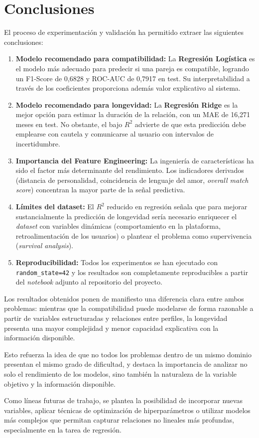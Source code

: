 \section{Conclusiones}
\label{sec:conclusiones_modelado}

El proceso de experimentación y validación ha permitido extraer las siguientes conclusiones:

\begin{enumerate}
    \item \textbf{Modelo recomendado para compatibilidad:} La \textbf{Regresión Logística} es el modelo más adecuado para predecir si una pareja es compatible, logrando un F1-Score de 0,6828 y ROC-AUC de 0,7917 en test. Su interpretabilidad a través de los coeficientes proporciona además valor explicativo al sistema.

    \item \textbf{Modelo recomendado para longevidad:} La \textbf{Regresión Ridge} es la mejor opción para estimar la duración de la relación, con un MAE de 16,271 meses en test. No obstante, el bajo $R^2$ advierte de que esta predicción debe emplearse con cautela y comunicarse al usuario con intervalos de incertidumbre.

    \item \textbf{Importancia del Feature Engineering:} La ingeniería de características ha sido el factor más determinante del rendimiento. Los indicadores derivados (distancia de personalidad, coincidencia de lenguaje del amor, \textit{overall match score}) concentran la mayor parte de la señal predictiva.

    \item \textbf{Límites del dataset:} El $R^2$ reducido en regresión señala que para mejorar sustancialmente la predicción de longevidad sería necesario enriquecer el \textit{dataset} con variables dinámicas (comportamiento en la plataforma, retroalimentación de los usuarios) o plantear el problema como supervivencia (\textit{survival analysis}).

    \item \textbf{Reproducibilidad:} Todos los experimentos se han ejecutado con \texttt{random\_state=42} y los resultados son completamente reproducibles a partir del \textit{notebook} adjunto al repositorio del proyecto.
\end{enumerate}

Los resultados obtenidos ponen de manifiesto una diferencia clara entre ambos problemas: mientras que la compatibilidad puede modelarse de forma razonable a partir de variables estructuradas y relaciones entre perfiles, la longevidad presenta una mayor complejidad y menor capacidad explicativa con la información disponible.

Esto refuerza la idea de que no todos los problemas dentro de un mismo dominio presentan el mismo grado de dificultad, y destaca la importancia de analizar no solo el rendimiento de los modelos, sino también la naturaleza de la variable objetivo y la información disponible.

Como líneas futuras de trabajo, se plantea la posibilidad de incorporar nuevas variables, aplicar técnicas de optimización de hiperparámetros o utilizar modelos más complejos que permitan capturar relaciones no lineales más profundas, especialmente en la tarea de regresión.